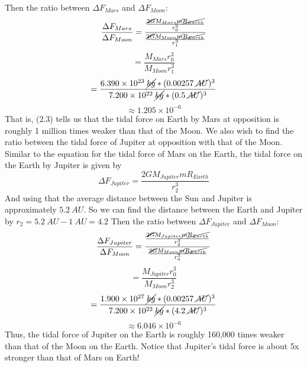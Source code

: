 \documentclass{article}
\begin{document}
Then the ratio between $\Delta F_{Mars}$ and $\Delta F_{Moon}$:
\[\frac{\Delta F_{Mars}}{\Delta F_{Moon}} = \frac{\frac{\cancel{2G}M_{Mars}\cancel{m}\cancel{R_{Earth}}}{r_0^3}}{\frac{\cancel{2G}M_{Moon}\cancel{m}\cancel{R_{Earth}}}{r_1^3}}\]
\[ = \frac{M_{Mars}r_0^3}{M_{Moon}r_1^3}\]
\[ = \frac{6.390 \times 10^{23} \: \cancel{kg} * (0.00257 \:\cancel{AU})^3 }{7.200 \times 10^{22} \: \cancel{kg} * (0.5 \: \cancel{AU})^3}\]
\begin{equation}
    \approx 1.205 \times 10^{-6}
\end{equation}
That is, (2.3) tells us that the tidal force on Earth by Mars at opposition is roughly 1 million times weaker than that of the Moon.
\newline\newline
We also wish to find the ratio between the tidal force of Jupiter at opposition with that of the Moon.
Similar to the equation for the tidal force of Mars on the Earth, the tidal force on the Earth by Jupiter is given by
\begin{equation}
    \Delta F_{Jupiter} = \frac{2GM_{Jupiter}mR_{Earth}}{r_2^3}
\end{equation}
And using that the average distance between the Sun and Jupiter is approximately $5.2 \: AU$. So we can find the distance between the Earth and Jupiter by 
$r_2 = 5.2 \: AU - 1 \: AU = 4.2 $
Then the ratio between $\Delta F_{Jupiter}$ and $\Delta F_{Moon}$:
\[\frac{\Delta F_{Jupiter}}{\Delta F_{Moon}} = \frac{\frac{\cancel{2G}M_{Jupiter}\cancel{m}\cancel{R_{Earth}}}{r_2^3}}{\frac{\cancel{2G}M_{Moon}\cancel{m}\cancel{R_{Earth}}}{r_0^3}}\]
\[ = \frac{M_{Jupiter}r_0^3}{M_{Moon}r_2^3}\]
\[ = \frac{1.900 \times 10^{27} \: \cancel{kg} * (0.00257 \: \cancel{AU})^3}{7.200 \times 10^{22} \: \cancel{kg} * (4.2 \: \cancel{AU})^3}\]
\begin{equation}
    \approx 6.046 \times 10^{-6}
\end{equation}
Thus, the tidal force of Jupiter on the Earth is roughly 160,000 times weaker than that of the Moon on the Earth. Notice that Jupiter's tidal force is about 5x stronger than that of Mars on Earth!
\end{document}
